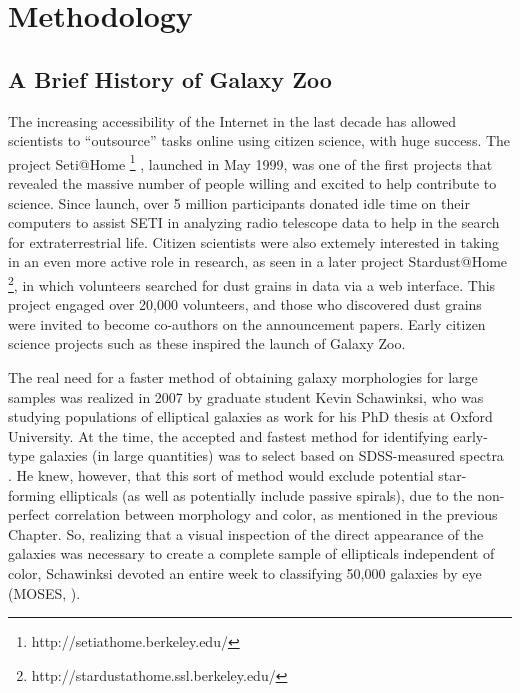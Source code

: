 \chapter{Methodology}
\label{chap:methodology}

\section{A Brief History of Galaxy Zoo}

The increasing accessibility of the Internet in the last decade has allowed scientists to ``outsource'' tasks online using citizen science, with huge success. The project Seti@Home \footnote{http://setiathome.berkeley.edu/} \citep{Anderson2002}, launched in May 1999, was one of the first projects that revealed the massive number of people willing and excited to help contribute to science. Since launch, over 5 million participants donated idle time on their computers to assist SETI in analyzing radio telescope data to help in the search for extraterrestrial life. Citizen scientists were also extemely interested in taking in an even more active role in research, as seen in a later project Stardust@Home \footnote{http://stardustathome.ssl.berkeley.edu/}, in which volunteers searched for dust grains in data via a web interface. This project engaged over 20,000 volunteers, and those who discovered dust grains were invited to become co-authors on the announcement papers. Early citizen science projects such as these inspired the launch of Galaxy Zoo.

The real need for a faster method of obtaining galaxy morphologies for large samples was realized in 2007 by graduate student Kevin Schawinksi, who was studying populations of elliptical galaxies as work for his PhD thesis at Oxford University. At the time, the accepted and fastest method for identifying early-type galaxies (in large quantities) was to select based on SDSS-measured spectra \citep{Bernardi2003}. He knew, however, that this sort of method would exclude potential star-forming ellipticals (as well as potentially include passive spirals), due to the non-perfect correlation between morphology and color, as mentioned in the previous Chapter. So, realizing that a visual inspection of the direct appearance of the galaxies was necessary to create a complete sample of ellipticals independent of color, Schawinksi devoted an entire week to classifying 50,000 galaxies by eye (MOSES, \citet{Schawinski2007}). 

